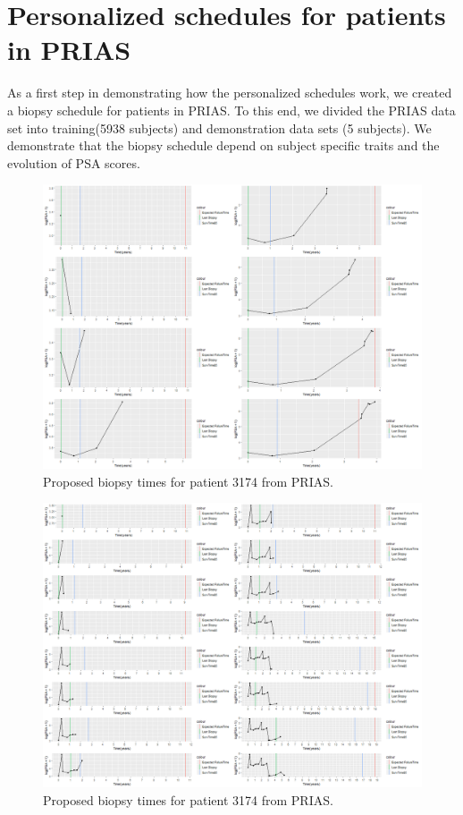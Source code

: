 
\section{Personalized schedules for patients in PRIAS}
\label{sec : pers_schedule_PRIAS}
As a first step in demonstrating how the personalized schedules work, we created a biopsy schedule for patients in PRIAS. To this end, we divided the PRIAS data set into training(5938 subjects) and demonstration data sets (5 subjects). We demonstrate that the biopsy schedule depend on subject specific traits and the evolution of PSA scores.\\ 

\begin{figure}[!htb]
\centering
\captionsetup{justification=centering}
\includegraphics[width=\textwidth]{prias_demo_pid_3174.png}
\caption{\label{fig : prias_demo_pid_3174} Proposed biopsy times for patient 3174 from PRIAS.}
\end{figure}

\begin{figure}[!htb]
\centering
\captionsetup{justification=centering}
\includegraphics[width=\textwidth]{prias_demo_pid_911.png}
\caption{\label{fig : prias_demo_pid_911} Proposed biopsy times for patient 3174 from PRIAS.}
\end{figure}


